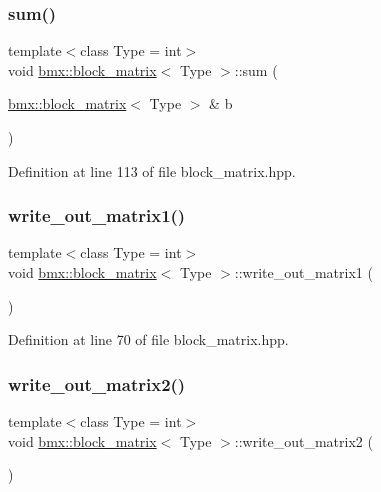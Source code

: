 \subsubsection{\texorpdfstring{sum()}{sum()}}
{\footnotesize\ttfamily template$<$class Type = int$>$ \\
void \mbox{\hyperlink{classbmx_1_1block__matrix}{bmx\+::block\+\_\+matrix}}$<$ Type $>$\+::sum (\begin{DoxyParamCaption}\item[{\mbox{\hyperlink{classbmx_1_1block__matrix}{bmx\+::block\+\_\+matrix}}$<$ Type $>$ \&}]{b }\end{DoxyParamCaption})\hspace{0.3cm}{\ttfamily [inline]}}



Definition at line 113 of file block\+\_\+matrix.\+hpp.

\mbox{\label{classbmx_1_1block__matrix_a010884e7b07582cd28e1de9d58521b62}} 
\subsubsection{\texorpdfstring{write\+\_\+out\+\_\+matrix1()}{write\_out\_matrix1()}}
{\footnotesize\ttfamily template$<$class Type = int$>$ \\
void \mbox{\hyperlink{classbmx_1_1block__matrix}{bmx\+::block\+\_\+matrix}}$<$ Type $>$\+::write\+\_\+out\+\_\+matrix1 (\begin{DoxyParamCaption}{ }\end{DoxyParamCaption})\hspace{0.3cm}{\ttfamily [inline]}}



Definition at line 70 of file block\+\_\+matrix.\+hpp.

\mbox{\label{classbmx_1_1block__matrix_a5e758f4af743778dedce4ce05f95a14a}} 
\subsubsection{\texorpdfstring{write\+\_\+out\+\_\+matrix2()}{write\_out\_matrix2()}}
{\footnotesize\ttfamily template$<$class Type = int$>$ \\
void \mbox{\hyperlink{classbmx_1_1block__matrix}{bmx\+::block\+\_\+matrix}}$<$ Type $>$\+::write\+\_\+out\+\_\+matrix2 (\begin{DoxyParamCaption}{ }\end{DoxyParamCaption})\hspace{0.3cm}{\ttfamily [inline]}}



